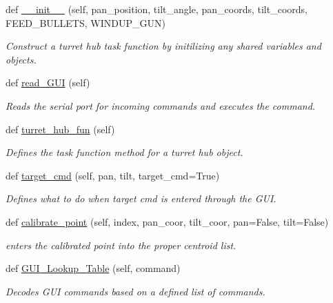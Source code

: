 \begin{DoxyCompactItemize}
\item 
def \hyperlink{classturret__hub__task__func_1_1Turret__Hub__Task_aef3d389ffa8ab5461ca905705ea7027d}{\+\_\+\+\_\+init\+\_\+\+\_\+} (self, pan\+\_\+position, tilt\+\_\+angle, pan\+\_\+coords, tilt\+\_\+coords, F\+E\+E\+D\+\_\+\+B\+U\+L\+L\+E\+TS, W\+I\+N\+D\+U\+P\+\_\+\+G\+UN)
\begin{DoxyCompactList}\small\item\em Construct a turret hub task function by initilizing any shared variables and objects. \end{DoxyCompactList}\item 
def \hyperlink{classturret__hub__task__func_1_1Turret__Hub__Task_ac88dbb9caa30adca8c9c33f0bf63e10f}{read\+\_\+\+G\+UI} (self)\hypertarget{classturret__hub__task__func_1_1Turret__Hub__Task_ac88dbb9caa30adca8c9c33f0bf63e10f}{}\label{classturret__hub__task__func_1_1Turret__Hub__Task_ac88dbb9caa30adca8c9c33f0bf63e10f}

\begin{DoxyCompactList}\small\item\em Reads the serial port for incoming commands and executes the command. \end{DoxyCompactList}\item 
def \hyperlink{classturret__hub__task__func_1_1Turret__Hub__Task_afde6b31121bcb5febadcac8d793d372a}{turret\+\_\+hub\+\_\+fun} (self)\hypertarget{classturret__hub__task__func_1_1Turret__Hub__Task_afde6b31121bcb5febadcac8d793d372a}{}\label{classturret__hub__task__func_1_1Turret__Hub__Task_afde6b31121bcb5febadcac8d793d372a}

\begin{DoxyCompactList}\small\item\em Defines the task function method for a turret hub object. \end{DoxyCompactList}\item 
def \hyperlink{classturret__hub__task__func_1_1Turret__Hub__Task_a2f73e545adeae63df7c41bfaa4d2bec4}{target\+\_\+cmd} (self, pan, tilt, target\+\_\+cmd=True)
\begin{DoxyCompactList}\small\item\em Defines what to do when target cmd is entered through the G\+UI. \end{DoxyCompactList}\item 
def \hyperlink{classturret__hub__task__func_1_1Turret__Hub__Task_ae055fe9d0cd5011fced5fb270a463249}{calibrate\+\_\+point} (self, index, pan\+\_\+coor, tilt\+\_\+coor, pan=False, tilt=False)
\begin{DoxyCompactList}\small\item\em enters the calibrated point into the proper centroid list. \end{DoxyCompactList}\item 
def \hyperlink{classturret__hub__task__func_1_1Turret__Hub__Task_a093eac7997f4225b4ad498f0751c01d4}{G\+U\+I\+\_\+\+Lookup\+\_\+\+Table} (self, command)
\begin{DoxyCompactList}\small\item\em Decodes G\+UI commands based on a defined list of commands. \end{DoxyCompactList}\end{DoxyCompactItemize}
